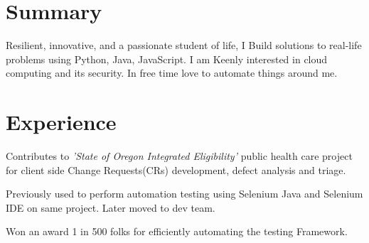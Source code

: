\documentclass[]{deedy-resume-openfont}
\begin{document}
\begin{minipage}[t]{0.66\textwidth} 


\section{Summary} 
Resilient, innovative, and a passionate student of life, I Build solutions to real-life problems using Python, Java, JavaScript. I am Keenly interested in cloud computing and its security. In free time love to automate things around me.


\section{Experience}

\vspace{\topsep} %
\begin{tightemize}
\item Contributes to \emph{'State of Oregon Integrated Eligibility'} public health care project for client side Change Requests(CRs) development, defect analysis and triage.
\item Previously used to perform  automation testing using Selenium Java and Selenium IDE on same project. Later moved to dev team.
\item Won an award 1 in 500 folks for efficiently automating the testing Framework.
\end{tightemize}
\sectionsep



\end{minipage}
\end{document}
